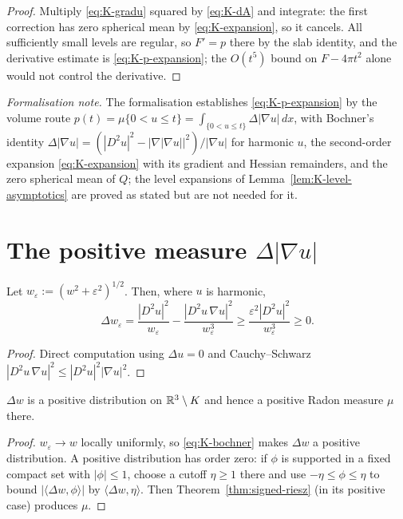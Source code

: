 \begin{proof}
Multiply \eqref{eq:K-gradu} squared by \eqref{eq:K-dA} and integrate: the
first correction has zero spherical mean by \eqref{eq:K-expansion}, so it
cancels.  All sufficiently small levels are regular, so $F'=p$ there by the
slab identity, and the derivative estimate is \eqref{eq:K-p-expansion}; the
$O(t^5)$ bound on $F-4\pi t^2$ alone would not control the derivative.
\end{proof}

\medskip\noindent\emph{Formalisation note.} The formalisation establishes \eqref{eq:K-p-expansion} by the volume route $p(t)=\mu\{0<u\le t\}=\int_{\{0<u\le t\}}\Delta|\nabla u|\,dx$, with Bochner's identity $\Delta|\nabla u|=(|D^2u|^2-|\nabla|\nabla u||^2)/|\nabla u|$ for harmonic $u$, the second-order expansion \eqref{eq:K-expansion} with its gradient and Hessian remainders, and the zero spherical mean of $Q$; the level expansions of Lemma~\ref{lem:K-level-asymptotics} are proved as stated but are not needed for it.

\section{The positive measure $\Delta|\nabla u|$}

\begin{lemma}\label{lem:K-bochner}
Let $w_\varepsilon:=(w^2+\varepsilon^2)^{1/2}$.  Then, where $u$ is harmonic,
\begin{equation}\label{eq:K-bochner}
  \Delta w_\varepsilon
  =\frac{|D^2u|^2}{w_\varepsilon}-\frac{|D^2u\,\nabla u|^2}{w_\varepsilon^3}
  \ge\frac{\varepsilon^2|D^2u|^2}{w_\varepsilon^3}\ge0 .
\end{equation}
\end{lemma}

\begin{proof}
Direct computation using $\Delta u=0$ and Cauchy--Schwarz
$|D^2u\,\nabla u|^2\le|D^2u|^2|\nabla u|^2$.
\end{proof}

\begin{proposition}[$\mu:=\Delta w$ is a positive Radon measure]\label{prop:K-mu}
$\Delta w$ is a positive distribution on $\mathbb R^3\setminus K$ and hence a positive
Radon measure $\mu$ there.
\end{proposition}

\begin{proof}
$w_\varepsilon\to w$ locally uniformly, so \eqref{eq:K-bochner} makes
$\Delta w$ a positive distribution.  A positive distribution has order zero:
if $\phi$ is supported in a fixed compact set with $|\phi|\le1$, choose a
cutoff $\eta\ge1$ there and use $-\eta\le\phi\le\eta$ to bound
$|\langle\Delta w,\phi\rangle|$ by $\langle\Delta w,\eta\rangle$.  Then
Theorem~\ref{thm:signed-riesz} (in its positive case) produces $\mu$.
\end{proof}

